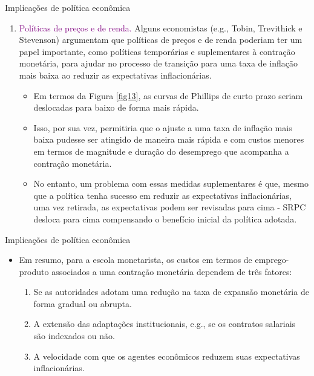 \documentclass[10pt]{beamer}
\begin{document}
\begin{frame}{Implicações de política econômica}
    \begin{itemize}
        \begin{enumerate}            
            \item \textcolor{purple}{Políticas de preços e de renda.} Alguns economistas (e.g., Tobin, Trevithick e Stevenson) argumentam que políticas de preços e de renda poderiam ter um papel importante, como políticas temporárias e suplementares à contração monetária, para ajudar no processo de transição para uma taxa de inflação mais baixa ao reduzir as expectativas inflacionárias.
            \bigskip
            \begin{itemize}
                \item Em termos da Figura \ref{fig13}, as curvas de Phillips de curto prazo seriam deslocadas para baixo de forma mais rápida.
                \bigskip
                \item Isso, por sua vez, permitiria que o ajuste a uma taxa de inflação mais baixa pudesse ser atingido de maneira mais rápida e com custos menores em termos de magnitude e duração do desemprego que acompanha a contração monetária.
                \bigskip
                \item No entanto, um problema com essas medidas suplementares é que, mesmo que a política tenha sucesso em reduzir as expectativas inflacionárias, uma vez retirada, as expectativas podem ser revisadas para cima - SRPC desloca para cima compensando o benefício inicial da política adotada.
            \end{itemize}
        \end{enumerate}
    \end{itemize}    
\end{frame}

\begin{frame}{Implicações de política econômica}
    \begin{itemize}
        \item Em resumo, para a escola monetarista, os custos em termos de emprego-produto associados a uma contração monetária dependem de três fatores:
        \bigskip
        \begin{enumerate}
            \item Se as autoridades adotam uma redução na taxa de expansão monetária de forma gradual ou abrupta.
            \bigskip
            \item A extensão das adaptações institucionais, e.g., se os contratos salariais são indexados ou não.
            \bigskip
            \item A velocidade com que os agentes econômicos reduzem suas expectativas inflacionárias.
        \end{enumerate}
    \end{itemize}    
\end{frame}
\end{document}
